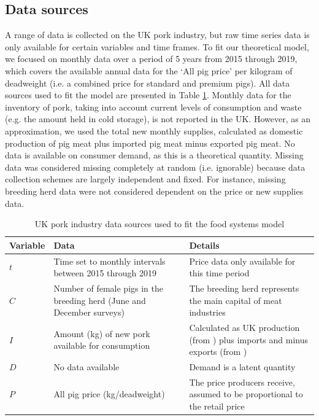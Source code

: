 \documentclass[12pt]{article}
\begin{document}
\subsection{Data sources}
A range of data is collected on the UK pork industry, but raw time series data is only available for certain variables and time frames. To fit our theoretical model, we focused on monthly data over a period of 5 years from 2015 through 2019, which covers the available annual data for the `All pig price' per kilogram of deadweight (i.e. a combined price for standard and premium pigs). All data sources used to fit the model are presented in Table \ref{table_data_sources}. Monthly data for the inventory of pork, taking into account current levels of consumption and waste (e.g. the amount held in cold storage), is not reported in the UK. However, as an approximation, we used the total new monthly supplies, calculated as domestic production of pig meat plus imported pig meat minus exported pig meat. No data is available on consumer demand, as this is a theoretical quantity. Missing data was considered missing completely at random (i.e. ignorable) because data collection schemes are largely independent and fixed. For instance, missing breeding herd data were not considered dependent on the price or new supplies data.


\begin{table}[]
  \centering
  \footnotesize
  \begin{tabular}{p{1.5cm}p{7cm}p{6cm}}
    \textbf{Variable} & \textbf{Data} & \textbf{Details} \\ \hline
    $t$ & Time set to monthly intervals between 2015 through 2019 & Price data only available for this time period \\
    $C$
    & Number of female pigs in the breeding herd (June and December surveys) \cite{DEFRAlivestocknumbers}
    & The breeding herd represents the main capital of meat industries \\
    $I$
    & Amount (kg) of new pork available for consumption \cite{DEFRApigcattlestats2020,AHDBpigmeatrade}
    & Calculated as UK production (from \cite{DEFRApigcattlestats2020}) plus imports and minus exports (from \cite{AHDBpigmeatrade})  \\
    $D$ & No data available & Demand is a latent quantity \\
    $P$ & All pig price (kg/deadweight) \cite{DEFRAlivestockprices} & The price producers receive, assumed to be proportional to the retail price \\ \hline
  \end{tabular}
  \caption{UK pork industry data sources used to fit the food systems model}
  \label{table_data_sources}
\end{table}
\end{document}
